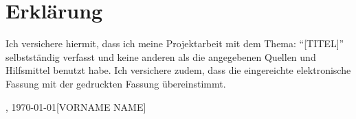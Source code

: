 
\section*{Erklärung}

Ich versichere hiermit, dass ich meine Projektarbeit mit dem Thema: \enquote{[TITEL]} selbstständig verfasst und keine anderen als die angegebenen Quellen und Hilfsmittel benutzt habe. Ich versichere zudem, dass die eingereichte elektronische Fassung mit der gedruckten Fassung übereinstimmt.

\vspace{3cm}
\noindent [ORT], \today \hfill [VORNAME NAME]